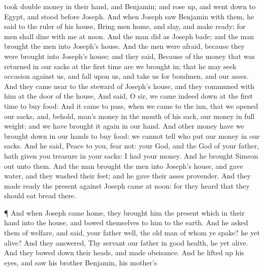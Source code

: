 {took
double
money in their
hand, and
Benjamin; and rose
up, and went
down to
Egypt, and
stood
before
Joseph.
And when
Joseph
saw
Benjamin
with them, he
said to the ruler of his
house,
Bring
{}
men
home, and
slay, and make
ready; for
{}
men shall
dine with me at
noon.
And the
man
did as
Joseph
bade; and the
man
brought the
men into
Joseph’s
house.
And the
men were
afraid, because they were
brought into
Joseph’s
house; and they
said,
Because of the
money that was
returned in our
sacks at the first
time are we brought
in; that he may seek
occasion against us, and
fall upon us, and
take us for
bondmen, and our
asses.
And they came
near to the
steward of
Joseph’s
house, and they
communed with him at the
door of the
house,
And
said,
O
sir, we came
indeed
down at the first
time to
buy
food:
And it came to pass, when we
came to the
inn, that we
opened our
sacks, and, behold,
{}
man’s
money
{} in the
mouth of his
sack, our
money in full
weight: and we have brought it
again in our
hand.
And
other
money have we brought
down in our
hands to
buy
food: we cannot
tell who
put our
money in our
sacks.
And he
said,
Peace
{} to you,
fear not: your
God, and the
God of your
father, hath
given you
treasure in your
sacks: I
had your
money. And he
brought
Simeon out unto them.
And the
man
brought the
men into
Joseph’s
house, and
gave
{}
water, and they
washed their
feet; and he
gave their
asses
provender.
And they made
ready the
present
against
Joseph
came at
noon: for they
heard that they should
eat
bread there.
\par }{\PP {}¶ And when
Joseph
came
home, they
brought him the
present which
{} in their
hand into the
house, and
bowed themselves to him to the
earth.
And he
asked them of
{}
welfare, and
said,
{} your
father
well, the old
man of whom ye
spake?
{} he yet
alive?
And they
answered, Thy
servant our
father
{} in good
health, he
{} yet
alive. And they bowed down their
heads, and made
obeisance.
And he lifted
up his
eyes, and
saw his
brother
Benjamin, his
mother’s
}
